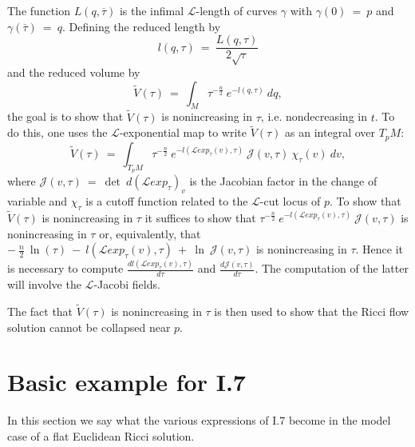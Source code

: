 The function $L(q, \overline{\tau})$ is the infimal ${\mathcal L}$-length of
curves $\gamma$ with $\gamma(0) \: = \: p$ and $\gamma(\overline{\tau})
\: = \: q$. Defining the reduced length by
\begin{equation} \label{reducedl}
l(q, {\tau}) \: = \: \frac{L(q, \tau)}{2 \sqrt{\tau}}
\end{equation}
and the reduced volume by
\begin{equation} \label{reducedv}
\tilde{V}(\tau) \: = \: \int_M \tau^{-\frac{n}{2}} \: e^{-l(q, \tau)} \:
dq,
\end{equation}
the goal is to show that $\tilde{V}(\tau)$ is
nonincreasing in $\tau$, i.e. nondecreasing in $t$.
To do this, one uses the ${\mathcal L}$-exponential map to
write $\tilde{V}(\tau)$ as an integral over $T_pM$:
\begin{equation}
\tilde{V}(\tau) \: = \: \int_{T_pM} \tau^{-\frac{n}{2}} \:
e^{-l({\mathcal L}exp_\tau(v), \tau)} \: {\mathcal J}(v, \tau) \:
\chi_{\tau}(v) \:
dv,
\end{equation}
where ${\mathcal J}(v, \tau) \: = \:
\det \: d\left( {\mathcal L}exp_\tau \right)_v$ is the Jacobian factor
in the change of variable and
$\chi_\tau$ is a cutoff function related to the
${\mathcal L}$-cut locus of $p$.
To show that $\tilde{V}(\tau)$ is
nonincreasing in $\tau$ it suffices to show that
$\tau^{-\frac{n}{2}} \:
e^{-l({\mathcal L}exp_\tau(v), \tau)}
\: {\mathcal J}(v, \tau)$ is nonincreasing
in $\tau$ or, equivalently, that $- \: \frac{n}{2} \: \ln(\tau) \:
- \: l({\mathcal L}exp_\tau(v), \tau) \: + \: \ln \:{\mathcal J}(v, \tau)$ is
nonincreasing in $\tau$. Hence it is necessary to compute
$\frac{dl({\mathcal L}exp_\tau(v), \tau)}{d\tau}$  and
$\frac{d{\mathcal J}(v, \tau)}{d\tau}$. The
computation of the latter will involve the ${\mathcal L}$-Jacobi fields.

The fact that $\tilde{V}(\tau)$ is
nonincreasing in $\tau$ is then used to show that the Ricci flow
solution cannot be  collapsed near $p$.

\section{Basic example for I.7} \label{7Euclidean}

 In this section we say what the various expressions of I.7 become in
 the model case of a flat Euclidean Ricci solution.

